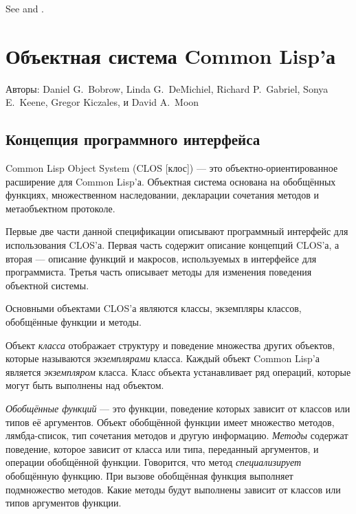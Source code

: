 \begin{defmac}

See  and .
\end{defmac}


\else %

\chapter{Объектная система Common Lisp'а}
\label{CLOS}

Авторы:  Daniel G.~Bobrow, Linda G.~DeMichiel,
Richard P.~Gabriel, Sonya E.~Keene, Gregor Kiczales,
и David A.~Moon

\section{Концепция программного интерфейса}

Common Lisp Object System (CLOS [клос]) --- это объектно-ориентированное
расширение для Common Lisp'а.  Объектная система основана на обобщённых
функциях, множественном наследовании, декларации сочетания методов и
метаобъектном протоколе.

Первые две части данной спецификации описывают программный интерфейс для
использования CLOS'а. Первая часть содержит описание концепций CLOS'а, а вторая
--- описание функций и макросов, используемых в 
интерфейсе для программиста. Третья часть описывает методы для изменения
поведения объектной системы.

Основными объектами CLOS'а являются классы, экземпляры классов, обобщённые
функции и методы.

Объект \emph{класса} отображает структуру и поведение множества других
объектов, которые называются \emph{экземплярами} класса.
Каждый объект Common Lisp'а является \emph{экземпляром} класса. Класс объекта
устанавливает ряд операций, которые могут быть выполнены над объектом.

\emph{Обобщённые функций} --- это функции, поведение которых зависит от классов
или типов её аргументов. Объект обобщённой функции имеет множество методов,
лямбда-список, тип сочетания методов и другую информацию. \emph{Методы} содержат
поведение, которое зависит от класса или типа, переданный аргументов, и операции
обобщённой функции. Говорится, что метод \emph{специализирует} обобщённую
функцию. При вызове обобщённая функция выполняет подмножество методов. Какие
методы будут выполнены зависит от классов или типов аргументов функции.

